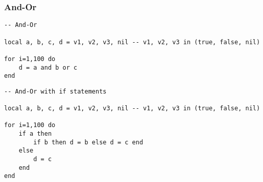 \subsubsection{And-Or}

\begin{mdframed}[style=LuaStyleFrame]
\begin{lstlisting}[style=LuaStyle]
-- And-Or

local a, b, c, d = v1, v2, v3, nil -- v1, v2, v3 in (true, false, nil)

for i=1,100 do
 	d = a and b or c
end
\end{lstlisting}
\end{mdframed}

\begin{mdframed}[style=LuaStyleFrame]
\begin{lstlisting}[style=LuaStyle]
-- And-Or with if statements

local a, b, c, d = v1, v2, v3, nil -- v1, v2, v3 in (true, false, nil)

for i=1,100 do
 	if a then
		if b then d = b else d = c end
	else
		d = c
	end
end
\end{lstlisting}
\end{mdframed}

